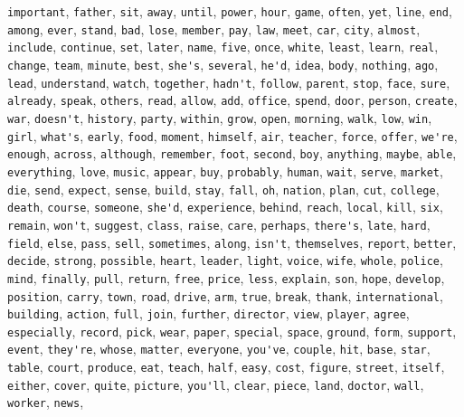 \verb|important|, \verb|father|, \verb|sit|, \verb|away|, \verb|until|, \verb|power|, \verb|hour|, \verb|game|, \verb|often|, \verb|yet|, \verb|line|, \verb|end|, \verb|among|, \verb|ever|, \verb|stand|, \verb|bad|, \verb|lose|, \verb|member|, \verb|pay|, \verb|law|, \verb|meet|, \verb|car|, \verb|city|, \verb|almost|, \verb|include|, \verb|continue|, \verb|set|, \verb|later|, \verb|name|, \verb|five|, \verb|once|, \verb|white|, \verb|least|, \verb|learn|, \verb|real|, \verb|change|, \verb|team|, \verb|minute|, \verb|best|, \verb|she's|, \verb|several|, \verb|he'd|, \verb|idea|, \verb|body|, \verb|nothing|, \verb|ago|, \verb|lead|, \verb|understand|, \verb|watch|, \verb|together|, \verb|hadn't|, \verb|follow|, \verb|parent|, \verb|stop|, \verb|face|, \verb|sure|, \verb|already|, \verb|speak|, \verb|others|, \verb|read|, \verb|allow|, \verb|add|, \verb|office|, \verb|spend|, \verb|door|, \verb|person|, \verb|create|, \verb|war|, \verb|doesn't|, \verb|history|, \verb|party|, \verb|within|, \verb|grow|, \verb|open|, \verb|morning|, \verb|walk|, \verb|low|, \verb|win|, \verb|girl|, \verb|what's|, \verb|early|, \verb|food|, \verb|moment|, \verb|himself|, \verb|air|, \verb|teacher|, \verb|force|, \verb|offer|, \verb|we're|, \verb|enough|, \verb|across|, \verb|although|, \verb|remember|, \verb|foot|, \verb|second|, \verb|boy|, \verb|anything|, \verb|maybe|, \verb|able|, \verb|everything|, \verb|love|, \verb|music|, \verb|appear|, \verb|buy|, \verb|probably|, \verb|human|, \verb|wait|, \verb|serve|, \verb|market|, \verb|die|, \verb|send|, \verb|expect|, \verb|sense|, \verb|build|, \verb|stay|, \verb|fall|, \verb|oh|, \verb|nation|, \verb|plan|, \verb|cut|, \verb|college|, \verb|death|, \verb|course|, \verb|someone|, \verb|she'd|, \verb|experience|, \verb|behind|, \verb|reach|, \verb|local|, \verb|kill|, \verb|six|, \verb|remain|, \verb|won't|, \verb|suggest|, \verb|class|, \verb|raise|, \verb|care|, \verb|perhaps|, \verb|there's|, \verb|late|, \verb|hard|, \verb|field|, \verb|else|, \verb|pass|, \verb|sell|, \verb|sometimes|, \verb|along|, \verb|isn't|, \verb|themselves|, \verb|report|, \verb|better|, \verb|decide|, \verb|strong|, \verb|possible|, \verb|heart|, \verb|leader|, \verb|light|, \verb|voice|, \verb|wife|, \verb|whole|, \verb|police|, \verb|mind|, \verb|finally|, \verb|pull|, \verb|return|, \verb|free|, \verb|price|, \verb|less|, \verb|explain|, \verb|son|, \verb|hope|, \verb|develop|, \verb|position|, \verb|carry|, \verb|town|, \verb|road|, \verb|drive|, \verb|arm|, \verb|true|, \verb|break|, \verb|thank|, \verb|international|, \verb|building|, \verb|action|, \verb|full|, \verb|join|, \verb|further|, \verb|director|, \verb|view|, \verb|player|, \verb|agree|, \verb|especially|, \verb|record|, \verb|pick|, \verb|wear|, \verb|paper|, \verb|special|, \verb|space|, \verb|ground|, \verb|form|, \verb|support|, \verb|event|, \verb|they're|, \verb|whose|, \verb|matter|, \verb|everyone|, \verb|you've|, \verb|couple|, \verb|hit|, \verb|base|, \verb|star|, \verb|table|, \verb|court|, \verb|produce|, \verb|eat|, \verb|teach|, \verb|half|, \verb|easy|, \verb|cost|, \verb|figure|, \verb|street|, \verb|itself|, \verb|either|, \verb|cover|, \verb|quite|, \verb|picture|, \verb|you'll|, \verb|clear|, \verb|piece|, \verb|land|, \verb|doctor|, \verb|wall|, \verb|worker|, \verb|news|, 
